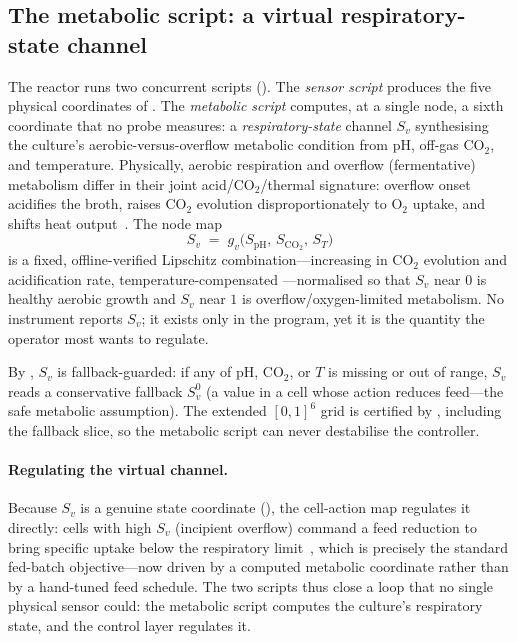 \documentclass[11pt,a4paper,twocolumn]{article}
\theoremstyle{thmstyle}
\theoremstyle{definition}
\theoremstyle{remark}
\begin{document}
\subsection{The metabolic script: a virtual respiratory-state channel}
\label{sec:metabolic-script}

The reactor runs two concurrent scripts (). The
\emph{sensor script} produces the five physical coordinates of
. The \emph{metabolic script} computes, at a single
node, a sixth coordinate that no probe measures: a \emph{respiratory-state}
channel $S_v$ synthesising the culture's aerobic-versus-overflow metabolic
condition from pH, off-gas $\mathrm{CO_2}$, and temperature. Physically,
aerobic respiration and overflow (fermentative) metabolism differ in their
joint acid/$\mathrm{CO_2}$/thermal signature: overflow onset acidifies the
broth, raises $\mathrm{CO_2}$ evolution disproportionately to $\mathrm{O_2}$
uptake, and shifts heat output~\citep{sonnleitner1986growth}. The node map
\begin{equation}
\label{eq:metabolic-node}
S_v \;=\; g_v\bigl(S_{\mathrm{pH}},\,S_{\mathrm{CO_2}},\,S_{T}\bigr)
\end{equation}
is a fixed, offline-verified Lipschitz combination---increasing in
$\mathrm{CO_2}$ evolution and acidification rate, temperature-compensated
---normalised so that $S_v$ near $0$ is healthy aerobic growth and $S_v$
near $1$ is overflow/oxygen-limited metabolism. No instrument reports
$S_v$; it exists only in the program, yet it is the quantity the operator
most wants to regulate.

By , $S_v$ is fallback-guarded: if any of pH,
$\mathrm{CO_2}$, or $T$ is missing or out of range, $S_v$ reads a
conservative fallback $S_v^{0}$ (a value in a cell whose action reduces
feed---the safe metabolic assumption). The extended $[0,1]^6$ grid is
certified by , including the fallback slice, so
the metabolic script can never destabilise the controller.

\paragraph{Regulating the virtual channel.}
Because $S_v$ is a genuine state coordinate (), the
cell-action map regulates it directly: cells with high $S_v$ (incipient
overflow) command a feed reduction to bring specific uptake below the
respiratory limit~\citep{sonnleitner1986growth,garciaortega2013fedbatch},
which is precisely the standard fed-batch objective---now driven by a
computed metabolic coordinate rather than by a hand-tuned feed schedule.
The two scripts thus close a loop that no single physical sensor could:
the metabolic script computes the culture's respiratory state, and the
control layer regulates it.
\end{document}
